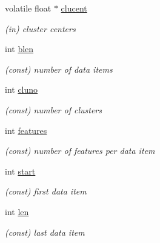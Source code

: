\begin{DoxyCompactItemize}
\mbox{\label{structkmeans__pt_aca0bb922070f8b7dd1f0e82a4b8ca607}} 
volatile float $\ast$ \mbox{\hyperlink{structkmeans__pt_aca0bb922070f8b7dd1f0e82a4b8ca607}{clucent}}
\begin{DoxyCompactList}\small\item\em (in) cluster centers \end{DoxyCompactList}\item 
\mbox{\label{structkmeans__pt_a4346d32e38a81feaf2799f25abf84a16}} 
int \mbox{\hyperlink{structkmeans__pt_a4346d32e38a81feaf2799f25abf84a16}{blen}}
\begin{DoxyCompactList}\small\item\em (const) number of data items \end{DoxyCompactList}\item 
\mbox{\label{structkmeans__pt_a987049eea35a32b1d1ba469f37b4a862}} 
int \mbox{\hyperlink{structkmeans__pt_a987049eea35a32b1d1ba469f37b4a862}{cluno}}
\begin{DoxyCompactList}\small\item\em (const) number of clusters \end{DoxyCompactList}\item 
\mbox{\label{structkmeans__pt_a0b7e9c2f96d55642a579c66c916dfbac}} 
int \mbox{\hyperlink{structkmeans__pt_a0b7e9c2f96d55642a579c66c916dfbac}{features}}
\begin{DoxyCompactList}\small\item\em (const) number of features per data item \end{DoxyCompactList}\item 
\mbox{\label{structkmeans__pt_a7568dca47a635b63a775853ace1a231f}} 
int \mbox{\hyperlink{structkmeans__pt_a7568dca47a635b63a775853ace1a231f}{start}}
\begin{DoxyCompactList}\small\item\em (const) first data item \end{DoxyCompactList}\item 
\mbox{\label{structkmeans__pt_af49609aa1989feab464cfc85a25c3ec4}} 
int \mbox{\hyperlink{structkmeans__pt_af49609aa1989feab464cfc85a25c3ec4}{len}}
\begin{DoxyCompactList}\small\item\em (const) last data item \end{DoxyCompactList}\item 

\end{DoxyCompactItemize}
